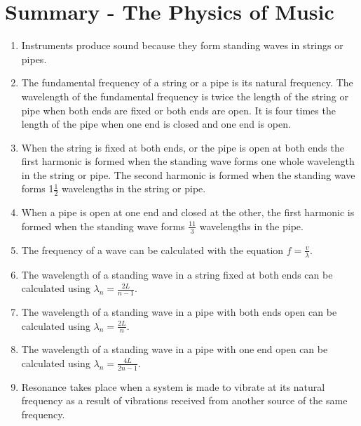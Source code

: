 \section{Summary - The Physics of Music}
\begin{enumerate}
\item Instruments produce sound because they form standing waves in strings or pipes.
\item The fundamental frequency of a string or a pipe is its natural frequency. The wavelength
of the fundamental frequency is twice the length of the string or pipe when both ends are fixed or both ends are open. It is four times the length of the pipe when one end is closed and one end is open.
\item When the string is fixed at both ends, or the pipe is open at both ends the first harmonic is formed when the standing wave forms one whole
wavelength in the string or pipe. The second harmonic is formed when the 
standing wave forms 1$\frac{1}{2}$ wavelengths in the string or pipe.
\item When a pipe is open at one end and closed at the other, the first harmonic is formed when the standing wave forms $\frac{11}{3}$ wavelengths in the pipe.
\item The frequency of a wave can be calculated with the equation $f = \frac{v}{\lambda}$.
\item The wavelength of a standing wave in a string fixed at both ends can be calculated using
$\lambda_{n} = \frac{2L}{n-1}$.
\item The wavelength of a standing wave in a pipe with both ends open can be calculated using
$\lambda_{n} = \frac{2L}{n}$.
\item The wavelength of a standing wave in a pipe with one end open can be calculated using
$\lambda_{n} = \frac{4L}{2n-1}$.
\item Resonance takes place when a system is made to vibrate at its natural frequency as a 
result of vibrations received from another source of the same frequency.
\end{enumerate}

